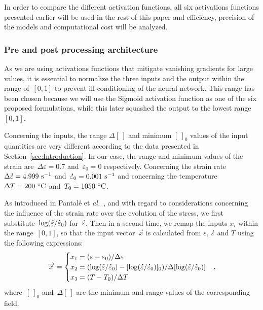 \documentclass[algorithms,article,submit,pdftex,oneauthors]{Definitions/mdpi}
\makeatletter
\DeclareRobustCommand{\mdot}[1]{\accentset{\mbox{\bfseries .}}{#1}}
\DeclareRobustCommand{\eal}{et \emph{al.}\@\xspace}
\DeclareRobustCommand{\ps}{\text{s}^{-1}}
\makeatother
\begin{document}
\textcolor{greencolor}{In order to compare the different activation functions, all six activations functions presented earlier will be used in the rest of this paper and efficiency, precision of the models and computational cost will be analyzed}.

\subsubsection{Pre and post processing architecture}\label{subsubsec:ANN-pre}

\textcolor{greencolor}{As we are using activations functions that mitigate vanishing gradients for large values, it is essential to normalize the three inputs and the output within the range of~$[0,1]$ to prevent ill-conditioning of the neural network.}
This range has been chosen because we will use the Sigmoid activation function as one of the six proposed formulations, while this later squashed the output to the lowest range~$[0,1]$.

Concerning the inputs, the range $\Delta[~]$ and minimum $[~]_{0}$ values of the input quantities are very different according to the data presented in Section~\ref{sec:Introduction}.
In our case, the range and minimum values of the strain are~$\Delta\varepsilon=0.7$ and~$\varepsilon_{0}=0$ respectively.
Concerning the strain rate~$\Delta\mdot{\varepsilon}=4.999~\ps$ and~$\mdot{\varepsilon}_{0}=0.001~\ps$ and concerning the temperature~$\Delta T=200~\celsius$ and~$T_{0}=1050~\celsius$.

\textcolor{greencolor}{As introduced in Pantalé \eal~\cite{Pantale-2021-EIN}, and with regard to considerations concerning the influence of the strain rate over the evolution of the stress, we first substitute~$\log(\mdot{\varepsilon}/\mdot{\varepsilon}_{0})$ for~$\mdot{\varepsilon}$.
Then in a second time, we remap the inputs $x_i$ within the range~$[0,1]$, so that the input vector~$\overrightarrow{x}$ is calculated from $\varepsilon$, $\mdot{\varepsilon}$ and $T$ using the following expressions:}
\begin{equation}
\overrightarrow{x}=
\begin{cases}
x_{1} = \left(\varepsilon - \varepsilon_{0}\right)/\Delta\varepsilon \\
x_{2} = \left(\log(\mdot{\varepsilon}/\mdot{\varepsilon}_{0})-[\log(\mdot{\varepsilon}/\mdot{\varepsilon}_{0})]_{0}\right)/\Delta[\log(\mdot{\varepsilon}/\mdot{\varepsilon}_{0})]\\
x_{3} = \left(T-T_{0}\right)/\Delta T
\end{cases},
\label{eq:ANN-input}
\end{equation}
where~$[~]_{0}$ and~$\Delta[~]$ are the minimum and range values of the corresponding field.
\end{document}
